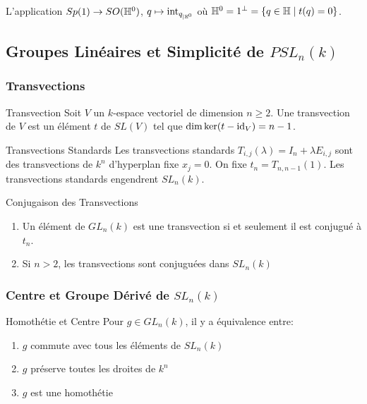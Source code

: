 \documentclass{cours}
\begin{document}
\begin{propositionfr}{}{}
    L'application $Sp(1) \rightarrow SO(\mathbb{H}^{0})$, $q\mapsto \text{int}_{q_{\mid\mathbb{H}^{0}}}$ où $\mathbb{H}^{0} = 1^{\perp} = \left\{q \in \mathbb{H} \mid t(q) = 0\right\}$.
\end{propositionfr}

\subsection{Groupes Linéaires et Simplicité de $PSL_{n}(k)$}

\subsubsection{Transvections}
\begin{définition}
    {Transvection}{}
    Soit $V$ un $k$-espace vectoriel de dimension $n \geq 2$. Une transvection de $V$ est un élément $t$ de $SL(V)$ tel que $\dim \ker (t - {\rm id}_{V}) = n - 1$.
\end{définition}
\begin{propositionfr}
    {Transvections Standards}{}
    Les transvections standards $T_{i, j}(\lambda) = I_{n} + \lambda E_{i, j}$ sont des transvections de $k^{n}$ d'hyperplan fixe $x_{j} = 0$. On fixe $t_{n} = T_{n, n- 1}(1)$. 
    Les transvections standards engendrent $SL_{n}(k)$.
\end{propositionfr}

\begin{propositionfr}
    {Conjugaison des Transvections}{}
    \begin{enumerate}
        \item Un élément de $GL_{n}(k)$ est une transvection si et seulement il est conjugué à $t_{n}$.
        \item Si $n > 2$, les transvections sont conjuguées dans $SL_{n}(k)$
    \end{enumerate}
\end{propositionfr}


\subsubsection{Centre et Groupe Dérivé de $SL_{n}(k)$}
\begin{propositionfr}
    {Homothétie et Centre}{}
    Pour $g \in GL_{n}(k)$, il y a équivalence entre: 
    \begin{enumerate}
        \item $g$ commute avec tous les éléments de $SL_{n}(k)$
        \item $g$ préserve toutes les droites de $k^{n}$
        \item $g$ est une homothétie
    \end{enumerate}
\end{propositionfr}
\end{document}
